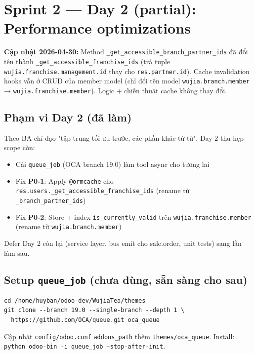 \chapter{Sprint 2 --- Day 2 (partial): Performance optimizations}

\textbf{Cập nhật 2026-04-30:} Method \texttt{\_get\_accessible\_branch\_partner\_ids} đã đổi tên thành \texttt{\_get\_accessible\_franchise\_ids} (trả tuple \texttt{wujia.franchise.management.id} thay cho \texttt{res.partner.id}). Cache invalidation hooks vẫn ở CRUD của member model (chỉ đổi tên model \texttt{wujia.branch.member} → \texttt{wujia.franchise.member}). Logic + chiến thuật cache không thay đổi.

\section{Phạm vi Day 2 (đã làm)}

Theo BA chỉ đạo "tập trung tối ưu trước, các phần khác từ từ", Day 2 thu hẹp scope còn:
\begin{itemize}
    \item Cài \texttt{queue\_job} (OCA branch 19.0) làm tool async cho tương lai
    \item Fix \textbf{P0-1}: Apply \texttt{@ormcache} cho \texttt{res.users.\_get\_accessible\_franchise\_ids} (rename từ \texttt{\_branch\_partner\_ids})
    \item Fix \textbf{P0-2}: Store + index \texttt{is\_currently\_valid} trên \texttt{wujia.franchise.member} (rename từ \texttt{wujia.branch.member})
\end{itemize}

Defer Day 2 còn lại (service layer, bus emit cho sale.order, unit tests) sang lần làm sau.

\section{Setup \texttt{queue\_job} (chưa dùng, sẵn sàng cho sau)}

\begin{lstlisting}[style=shell]
cd /home/huyban/odoo-dev/WujiaTea/themes
git clone --branch 19.0 --single-branch --depth 1 \
  https://github.com/OCA/queue.git oca_queue
\end{lstlisting}

Cập nhật \texttt{config/odoo.conf} \texttt{addons\_path} thêm \texttt{themes/oca\_queue}.
Install: \texttt{python odoo-bin -i queue\_job --stop-after-init}.

